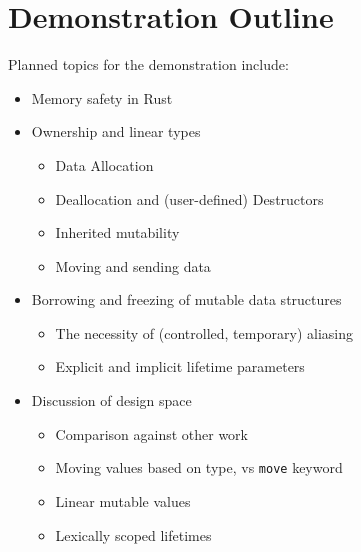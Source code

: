 \documentclass{acm_proc_article-sp}
\begin{document}
\section{Demonstration Outline}

{}

Planned topics for the demonstration include:
\begin{itemize}
\item Memory safety in Rust
\item Ownership and linear types
\begin{itemize}
\item Data Allocation
\item Deallocation and (user-defined) Destructors
\item Inherited mutability
\item Moving and sending data
\end{itemize}
\item Borrowing and freezing of mutable data structures
\begin{itemize}
\item The necessity of (controlled, temporary) aliasing
\item Explicit and implicit lifetime parameters
\end{itemize}
\item Discussion of design space
\begin{itemize}
\item Comparison against other work
\item Moving values based on type, vs {\tt move} keyword
\item Linear mutable values
\item Lexically scoped lifetimes
\end{itemize}
\end{itemize}
\end{document}
